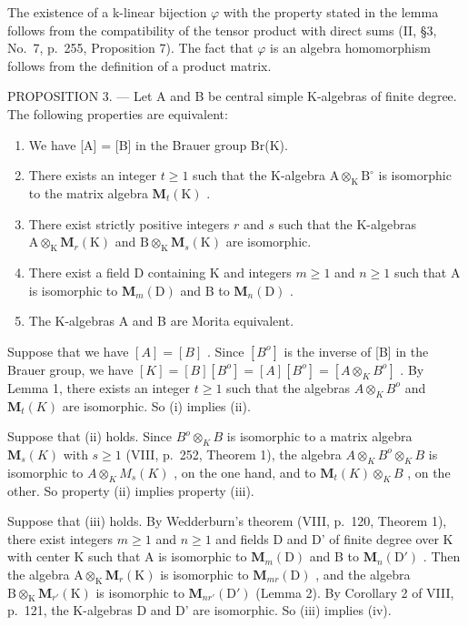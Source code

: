 The existence of a k-linear bijection \(\varphi\) with the property stated in the lemma follows from the compatibility of the tensor product with direct sums (II, §3, No.~7, p.~255, Proposition 7). The fact that \(\varphi\) is an algebra homomorphism follows from the definition of a product matrix.

PROPOSITION 3. --- Let A and B be central simple K-algebras of finite degree. The following properties are equivalent:

\begin{enumerate}
\def\labelenumi{(\roman{enumi})}
\item
  We have {[}A{]} = {[}B{]} in the Brauer group Br(K).
\item
  There exists an integer \(t \geqslant 1\) such that the K-algebra \(\mathrm{A} \otimes_{\mathrm{K}} \mathrm{B}^{\circ}\) is isomorphic to the matrix algebra \(\mathbf{M}_t(\mathrm{K})\) .
\item
  There exist strictly positive integers \(r\) and \(s\) such that the K-algebras \(\mathrm{A} \otimes_{\mathrm{K}} \mathbf{M}_r(\mathrm{K})\) and \(\mathrm{B} \otimes_{\mathrm{K}} \mathbf{M}_s(\mathrm{K})\) are isomorphic.
\item
  There exist a field D containing K and integers \(m \geqslant 1\) and \(n \geqslant 1\) such that A is isomorphic to \(\mathbf{M}_{m}(\mathrm{D})\) and B to \(\mathbf{M}_{n}(\mathrm{D})\) .
\item
  The K-algebras A and B are Morita equivalent.
\end{enumerate}

Suppose that we have \([A]=[B]\) . Since \([B^{o}]\) is the inverse of {[}B{]} in the Brauer group, we have \([K]=[B][B^{o}]=[A][B^{o}]=[A\otimes_{K}B^{o}]\) . By Lemma 1, there exists an integer \(t\geqslant1\) such that the algebras \(A\otimes_{K}B^{o}\) and \(\mathbf{M}_{t}(K)\) are isomorphic. So (i) implies (ii).

Suppose that (ii) holds. Since \(B^{o} \otimes_{K} B\) is isomorphic to a matrix algebra \(\mathbf{M}_{s}(K)\) with \(s \geqslant 1\) (VIII, p.~252, Theorem 1), the algebra \(A \otimes_{K} B^{o} \otimes_{K} B\) is isomorphic to \(A \otimes_{K} M_{s}(K)\) , on the one hand, and to \(\mathbf{M}_{t}(K) \otimes_{K} B\) , on the other. So property (ii) implies property (iii).

Suppose that (iii) holds. By Wedderburn's theorem (VIII, p.~120, Theorem 1), there exist integers \(m \geqslant 1\) and \(n \geqslant 1\) and fields D and D' of finite degree over K with center K such that A is isomorphic to \(\mathbf{M}_m(\mathrm{D})\) and B to \(\mathbf{M}_n(\mathrm{D}')\) . Then the algebra \(\mathrm{A} \otimes_{\mathrm{K}} \mathbf{M}_r(\mathrm{K})\) is isomorphic to \(\mathbf{M}_{mr}(\mathrm{D})\) , and the algebra \(\mathrm{B} \otimes_{\mathrm{K}} \mathbf{M}_{r'}(\mathrm{K})\) is isomorphic to \(\mathbf{M}_{nr'}(\mathrm{D}')\) (Lemma 2). By Corollary 2 of VIII, p.~121, the K-algebras D and D' are isomorphic. So (iii) implies (iv).

